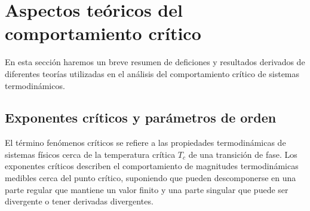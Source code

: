 
\section{Aspectos teóricos del comportamiento crítico}
\label{sec:teoria}

En esta sección haremos un breve resumen de deficiones y resultados derivados de
 diferentes teorías utilizadas en el análisis del comportamiento crítico de
 sistemas termodinámicos.

\subsection{Exponentes críticos y parámetros de orden}

El término fenómenos críticos se refiere a las propiedades termodinámicas de
sistemas físicos cerca de la temperatura crítica $T_{c}$ de una transición de
fase. Los exponentes críticos describen el comportamiento de magnitudes
 termodinámicas medibles cerca del punto crítico, suponiendo que pueden
 descomponerse en una parte regular que mantiene un valor finito y una parte
 singular que puede ser divergente o tener derivadas divergentes.\\

